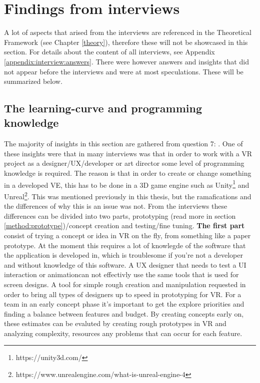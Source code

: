 \section{Findings from interviews}
\label{result:interviews}
A lot of aspects that arised from the interviews are referenced in the Theoretical Framework (see Chapter \ref{theory}), therefore these will not be showcased in this section. For details about the content of all interviews, see Appendix \ref{appendix:interview:answers}. There were however answers and insights that did not appear before the interviews and were at most speculations. These will be summarized below.
\subsection{The learning-curve and programming knowledge}
\label{result:interviews:learningcurve}
The majority of insights in this section are gathered from question 7: . One of these insights were that in many interviews was that in order to work with a VR project as a designer/UX/developer or art director some level of programming knowledge is required. The reason is that in order to create or change something in a developed VE, this has to be done in a 3D game engine such as Unity\footnote{https://unity3d.com/} and Unreal\footnote{https://www.unrealengine.com/what-is-unreal-engine-4}. This was mentioned previously in this thesis, but the ramafications and the differences of why this is an issue was not. From the interviews these differences can be divided into two parts, prototyping (read more in section \ref{method:prototype})/concept creation and testing/fine tuning. \textbf{The first part} consist of trying a concept or idea in VR on the fly, from something like a paper prototype. At the moment this requires a lot of knowlegde of the software that the application is developed in, which is troublesome if you're not a developer and without knowledge of this software. A UX designer that needs to test a UI interaction or animationcan not effectivly use the same tools that is used for  screen designs. A tool for simple rough creation and manipulation requested in order to bring all types of designers up to speed in prototyping for VR. For a team in an early concept phase it's important to get the explore priorities and finding a balance between features and budget. By creating concepts early on, these estimates can be evaluted by creating rough prototypes in VR and analyzing complexity, resources any problems that can occur for each feature.

